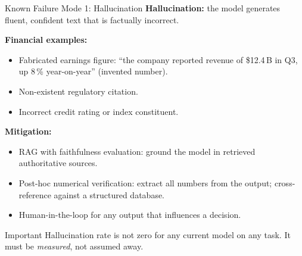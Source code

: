 \documentclass[11pt,aspectratio=169,professionalfonts]{beamer}
\begin{document}
\begin{frame}{Known Failure Mode 1: Hallucination}
  \textbf{Hallucination:} the model generates fluent, confident text
  that is factually incorrect.

  \textbf{Financial examples:}
  \begin{itemize}
    \item Fabricated earnings figure: ``the company reported revenue of
          \$12.4\,B in Q3, up 8\,\% year-on-year'' (invented number).
    \item Non-existent regulatory citation.
    \item Incorrect credit rating or index constituent.
  \end{itemize}

  \vspace{0.3em}
  \textbf{Mitigation:}
  \begin{itemize}
    \item RAG with faithfulness evaluation: ground the model in
          retrieved authoritative sources.
    \item Post-hoc numerical verification: extract all numbers from
          the output; cross-reference against a structured database.
    \item Human-in-the-loop for any output that influences a decision.
  \end{itemize}

  \begin{block}{Important}
    Hallucination rate is not zero for any current model on any task.
    It must be \emph{measured}, not assumed away.
  \end{block}
\end{frame}
%
%
\end{document}
